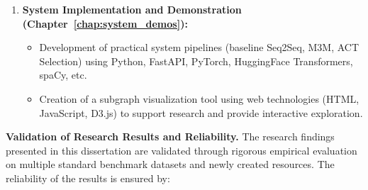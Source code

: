 \begin{enumerate}
\begin{itemize}
    \end{itemize}
    \item \textbf{System Implementation and Demonstration (Chapter~\ref{chap:system_demos}):}
    \begin{itemize}
        \item Development of practical system pipelines (baseline Seq2Seq, M3M, ACT Selection) using Python, FastAPI, PyTorch, HuggingFace Transformers, spaCy, etc.
        \item Creation of a subgraph visualization tool using web technologies (HTML, JavaScript, D3.js) to support research and provide interactive exploration.
    \end{itemize}
\end{enumerate}

\textbf{Validation of Research Results and Reliability.}
The research findings presented in this dissertation are validated through rigorous empirical evaluation on multiple standard benchmark datasets and newly created resources. The reliability of the results is ensured by:
